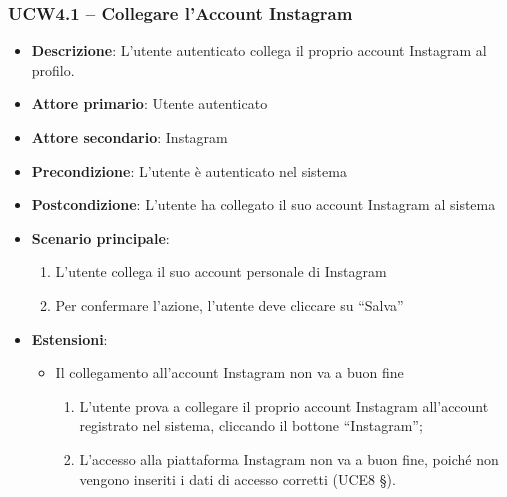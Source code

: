 \subsubsection{UCW4.1 – Collegare l'Account Instagram}
\begin{itemize}
\item \textbf{Descrizione}: L'utente autenticato collega il proprio account Instagram al profilo.
\item \textbf{Attore primario}: Utente autenticato
\item \textbf{Attore secondario}: Instagram
\item \textbf{Precondizione}: L’utente è autenticato nel sistema
\item \textbf{Postcondizione}: L’utente ha collegato il suo account Instagram al sistema

\item \textbf{Scenario principale}:
\begin{enumerate}
\item L’utente collega il suo account personale di Instagram
\item Per confermare l’azione, l’utente deve cliccare su “Salva” 
\end{enumerate}

\item \textbf{Estensioni}:
\begin{itemize}
\item Il collegamento all’account Instagram non va a buon fine
\begin{enumerate}
	\item L’utente prova a collegare il proprio account Instagram all’account registrato nel sistema, cliccando il bottone “Instagram”;
	\item L’accesso alla piattaforma Instagram non va a buon fine, poiché non vengono inseriti i dati di accesso corretti (UCE8 §).
\end{enumerate}
\end{itemize}
\end{itemize}

